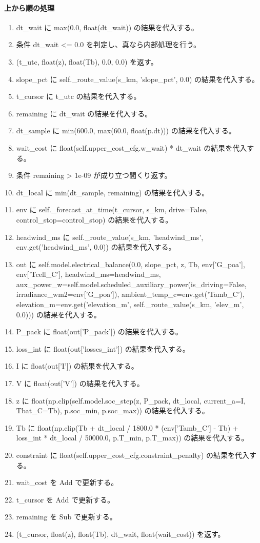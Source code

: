 \documentclass[a4paper,11pt]{article}
\begin{document}
            \paragraph{上から順の処理}
            \begin{enumerate}[leftmargin=1.8em]
            \item dt\_wait に max(0.0, float(dt\_wait)) の結果を代入する。
\item 条件 dt\_wait <= 0.0 を判定し、真なら内部処理を行う。
\item   (t\_utc, float(z), float(Tb), 0.0, 0.0) を返す。
\item slope\_pct に self.\_route\_value(s\_km, 'slope\_pct', 0.0) の結果を代入する。
\item t\_cursor に t\_utc の結果を代入する。
\item remaining に dt\_wait の結果を代入する。
\item dt\_sample に min(600.0, max(60.0, float(p.dt))) の結果を代入する。
\item wait\_cost に float(self.upper\_cost\_cfg.w\_wait) * dt\_wait の結果を代入する。
\item 条件 remaining > 1e-09 が成り立つ間くり返す。
\item   dt\_local に min(dt\_sample, remaining) の結果を代入する。
\item   env に self.\_forecast\_at\_time(t\_cursor, s\_km, drive=False, control\_stop=control\_stop) の結果を代入する。
\item   headwind\_ms に self.\_route\_value(s\_km, 'headwind\_ms', env.get('headwind\_ms', 0.0)) の結果を代入する。
\item   out に self.model.electrical\_balance(0.0, slope\_pct, z, Tb, env['G\_poa'], env['Tcell\_C'], headwind\_ms=headwind\_ms, aux\_power\_w=self.model.scheduled\_auxiliary\_power(is\_driving=False, irradiance\_wm2=env['G\_poa']), ambient\_temp\_c=env.get('Tamb\_C'), elevation\_m=env.get('elevation\_m', self.\_route\_value(s\_km, 'elev\_m', 0.0))) の結果を代入する。
\item   P\_pack に float(out['P\_pack']) の結果を代入する。
\item   loss\_int に float(out['losses\_int']) の結果を代入する。
\item   I に float(out['I']) の結果を代入する。
\item   V に float(out['V']) の結果を代入する。
\item   z に float(np.clip(self.model.soc\_step(z, P\_pack, dt\_local, current\_a=I, Tbat\_C=Tb), p.soc\_min, p.soc\_max)) の結果を代入する。
\item   Tb に float(np.clip(Tb + dt\_local / 1800.0 * (env['Tamb\_C'] - Tb) + loss\_int * dt\_local / 50000.0, p.T\_min, p.T\_max)) の結果を代入する。
\item   constraint に float(self.upper\_cost\_cfg.constraint\_penalty) の結果を代入する。
\item   wait\_cost を Add で更新する。
\item   t\_cursor を Add で更新する。
\item   remaining を Sub で更新する。
\item (t\_cursor, float(z), float(Tb), dt\_wait, float(wait\_cost)) を返す。
            \end{enumerate}
\end{document}
